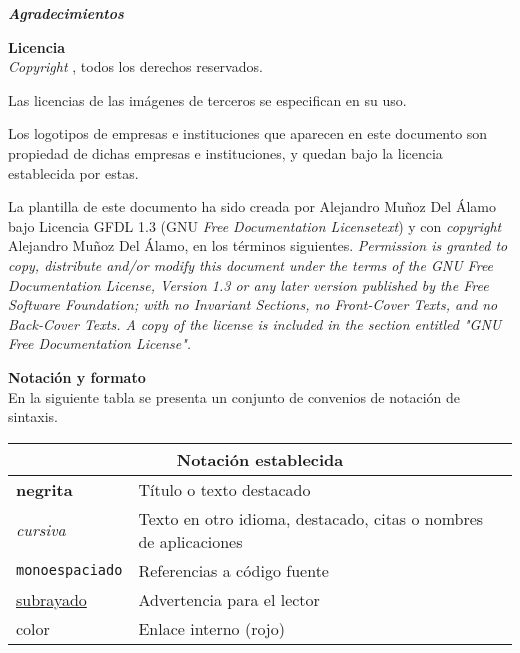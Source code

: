 


{\large \textbf{\textit{Agradecimientos}}}
\lorem

\blankpage

{\large \textbf{Licencia}}\\

\textit{Copyright}  \autor, todos los derechos reservados.

Las licencias de las imágenes de terceros se especifican en su uso. \newline

Los logotipos de empresas e instituciones que aparecen en este
documento son propiedad de dichas empresas e instituciones, y quedan bajo la licencia
establecida por estas. \newline

La plantilla de este documento ha sido creada por Alejandro Muñoz Del Álamo bajo 
Licencia GFDL 1.3 (GNU \textit{Free Documentation Licensetext}) y con 
\textit{copyright } Alejandro Muñoz Del Álamo, en los términos siguientes.
\textit{Permission is granted to copy, distribute and/or modify this document under the terms 
of the GNU Free Documentation License, Version 1.3 or any later version published by the Free 
Software Foundation; with no Invariant Sections, no Front-Cover Texts, and no Back-Cover Texts. 
A copy of the license is included in the section entitled "GNU Free Documentation License".}

\blankpage

{\large \textbf{Notación y formato}} \\

En la siguiente tabla se presenta un conjunto de convenios de notación de sintaxis.\\ 

\begin{tabular}{|l|l}
    \hline \multicolumn{2}{|c|}{Notación establecida} \\ \hline
    \textbf{negrita} & Título o texto destacado \\ \hline 
    \textit{cursiva} & Texto en otro idioma, destacado, citas o nombres de aplicaciones \\ \hline
    \texttt{monoespaciado} & Referencias a código fuente \\ \hline
    \underline{subrayado} & Advertencia para el lector \\ \hline
    color & Enlace interno (rojo) \\ \hline
\end{tabular}

